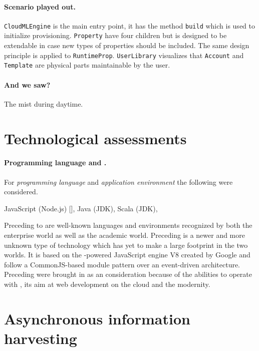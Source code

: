 \paragraph{Scenario played out.}



\texttt{CloudMLEngine} is the main entry point, it has the method \texttt{build}
which is used to initialize provisioning.
\texttt{Property} have four children but is designed to be extendable in case
new types of properties should be included. The same design principle
is applied to \texttt{RuntimeProp}.
\texttt{UserLibrary} visualizes that \texttt{Account} and \texttt{Template} are 
physical parts maintainable by the user.

\paragraph{And we saw?}

The mist during daytime.



\section{Technological assessments}

\paragraph{Programming language and .}

For \emph{programming language} and \emph{application environment} the following were considered.
\begin{ii}
  \iitem JavaScript (Node.js) [],
  \iitem Java (JDK),
  \iitem Scala (JDK),
\end{ii}
Preceding  to  are well-known languages and environments recognized by both the enterprise world as well as the academic world.
Preceding  is a newer and more unknown type of technology which has yet to 
make a large footprint in the two worlds. 
It is based on the -powered JavaScript engine V8 created by Google and follow a 
CommonJS-based module pattern over an event-driven architecture.
Preceding  were brought in as an consideration because of the abilities to operate
with , its aim at web development on the cloud and the modernity.

\section{Asynchronous information harvesting}

